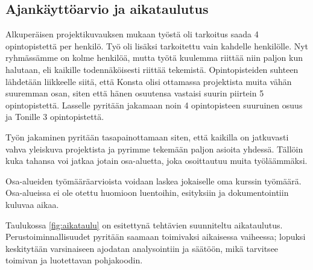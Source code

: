 \documentclass{article}
\begin{document}
\subsection{Ajankäyttöarvio ja aikataulutus}
\label{sec:ajankaytto}

Alkuperäisen projektikuvauksen mukaan työstä oli tarkoitus saada 4 opintopistettä per henkilö. Työ oli lisäksi tarkoitettu vain kahdelle henkilölle. Nyt ryhmässämme on kolme henkilöä, mutta työtä kuulemma riittää niin paljon kun halutaan, eli kaikille todennäköisesti riittää tekemistä. Opintopisteiden suhteen lähdetään liikkeelle siitä, että Konsta olisi ottamassa projektista muita vähän suuremman osan, siten että hänen osuutensa vastaisi suurin piirtein 5 opintopistettä. Lasselle pyritään jakamaan noin 4 opintopisteen suuruinen osuus ja Tonille 3 opintopistettä.

Työn jakaminen pyritään tasapainottamaan siten, että kaikilla on jatkuvasti vahva yleiskuva projektista ja pyrimme tekemään paljon asioita yhdessä. Tällöin kuka tahansa voi jatkaa jotain osa-aluetta, joka osoittautuu muita työläämmäksi.

Osa-alueiden työmääräarvioista voidaan laskea jokaiselle oma kurssin työmäärä. Osa-alueissa ei ole otettu huomioon luentoihin, esityksiin ja dokumentointiin kuluvaa aikaa.

Taulukossa \ref{fig:aikataulu} on esitettynä tehtävien suunniteltu aikataulutus. Perustoiminnallisuudet pyritään saamaan toimivaksi aikaisessa vaiheessa; lopuksi keskitytään varsinaiseen ajodatan analysointiin ja säätöön, mikä tarvitsee toimivan ja luotettavan pohjakoodin.
\end{document}
